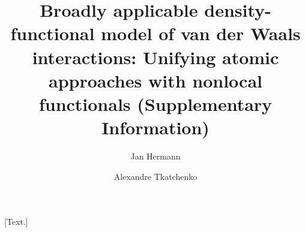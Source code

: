 

\title{Broadly applicable density-functional model of van der Waals interactions: Unifying atomic approaches with nonlocal functionals (Supplementary Information)}

\renewcommand{\thefigure}{S\arabic{figure}}



\nocite{achemso-control}

\maketitle

\author[1]{Jan Hermann}
\author[1,*]{Alexandre Tkatchenko}

[Text.]

